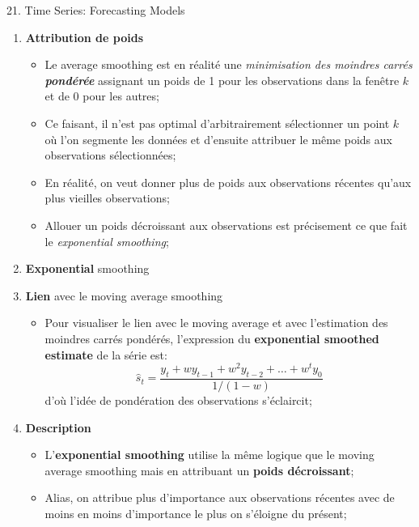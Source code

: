 \documentclass[12pt, titlepage, french]{report}
\begin{document}
\begin{CHPT_SUMM}[label = {timeseries21}]{21. Time Series: Forecasting Models}
\begin{enumerate}
\begin{itemize}
\begin{equation*}
			b_{1, T}	
				=	\frac{2(\hat{s}_{t}^{(1)} - \hat{s}_{t}^{(2)})}{k - 1}
			\end{equation*}
		\item	Et la prévision $l$ lead times dans le futur :
			\begin{equation*}
			\hat{y}_{T + l}
				=	\hat{s}_{t} + b_{1, T}	
			\end{equation*}
		\end{itemize}
	\item[]	\textbf{Attribution de poids}
		\begin{itemize}
		\item	Le average smoothing est en réalité une \textit{minimisation des moindres carrés \textbf{pondérée}} assignant un poids de 1 pour les observations dans la fenêtre $k$ et de 0 pour les autres;
		\item[]	Ce faisant, il n'est pas optimal d'arbitrairement sélectionner un point $k$ où l'on segmente les données et d'ensuite attribuer le même poids aux observations sélectionnées;
		\item[]	En réalité, on veut donner plus de poids aux observations récentes qu'aux plus vieilles observations;
		\item[]	Allouer un poids décroissant aux observations est précisement ce que fait le \textit{exponential smoothing};
		\end{itemize}	
	\item	\textbf{Exponential} smoothing	
	\item[]	\textbf{Lien} avec le moving average smoothing
		\begin{itemize}
		\item	Pour visualiser le lien avec le moving average et avec l'estimation des moindres carrés pondérés, l'expression du \textbf{exponential smoothed estimate} de la série est:
			\begin{equation*}
			\hat{s}_{t}
				=	\frac{y_{t} + w y_{t - 1} + w^{2} y_{t - 2} + \dots + w^{t} y_{0}}{1/(1 - w)}
			\end{equation*}
			d'où l'idée de pondération des observations s'éclaircit;
		\end{itemize}
	\item[]	\textbf{Description}
		\begin{itemize}
		\item	L'\textbf{exponential smoothing} utilise la même logique que le moving average smoothing mais en attribuant un \textbf{poids décroissant};
		\item[] Alias, on attribue plus d'importance aux observations récentes avec de moins en moins d'importance le plus on s'éloigne du présent;

\end{itemize}
\end{enumerate}
\end{CHPT_SUMM}
\end{document}
